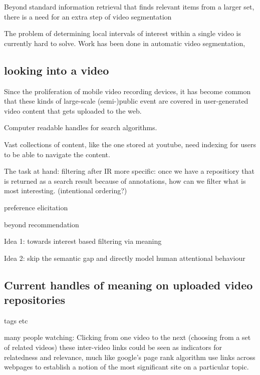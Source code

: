 Beyond standard information retrieval that finds relevant items from a larger set, there is a need for an extra step of video segmentation 





The problem of determining local intervals of interest within a single video is currently hard to solve. Work has been done in automatic video segmentation,

\subsection{looking into a video}










Since the proliferation of mobile video recording devices, it has become common that these kinds of large-scale (semi-)public event are covered in user-generated video content that gets uploaded to the web. 


Computer readable  handles for search algorithms. 


Vast collections of content, like the one stored at youtube, need indexing for users to be able to navigate the content.  








The task at hand: filtering after IR
more specific: once we have a repositiory that is returned as a search result because of annotations, how can we filter what is most interesting. (intentional ordering?)

preference elicitation

beyond recommendation


Idea 1: towards interest based filtering via meaning

Idea 2: skip the semantic gap and directly model human attentional behaviour


\subsection{Current handles of meaning on uploaded video repositories}
tags etc


many people watching:
Clicking from one video to the next (choosing from a set of related videos)
these inter-video links could be seen as indicators for relatedness and relevance, much like google's page rank algorithm use links across webpages to establish a notion of the most significant site on a particular topic. 

